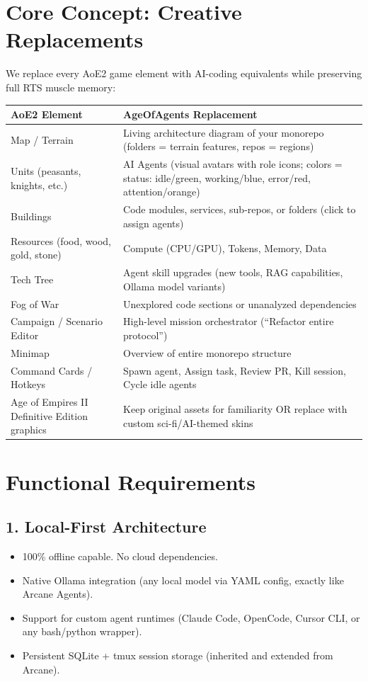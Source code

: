 \documentclass[11pt,a4paper]{article}
\begin{document}
\section{Core Concept: Creative Replacements}

We replace every AoE2 game element with AI-coding equivalents while preserving full RTS muscle memory:

\begin{longtable}{ll}
\toprule
\textbf{AoE2 Element} & \textbf{AgeOfAgents Replacement} \\
\midrule
Map / Terrain & Living architecture diagram of your monorepo (folders = terrain features, repos = regions) \\
Units (peasants, knights, etc.) & AI Agents (visual avatars with role icons; colors = status: idle/green, working/blue, error/red, attention/orange) \\
Buildings & Code modules, services, sub-repos, or folders (click to assign agents) \\
Resources (food, wood, gold, stone) & Compute (CPU/GPU), Tokens, Memory, Data \\
Tech Tree & Agent skill upgrades (new tools, RAG capabilities, Ollama model variants) \\
Fog of War & Unexplored code sections or unanalyzed dependencies \\
Campaign / Scenario Editor & High-level mission orchestrator (``Refactor entire protocol'') \\
Minimap & Overview of entire monorepo structure \\
Command Cards / Hotkeys & Spawn agent, Assign task, Review PR, Kill session, Cycle idle agents \\
Age of Empires II Definitive Edition graphics & Keep original assets for familiarity OR replace with custom sci-fi/AI-themed skins \\
\bottomrule
\end{longtable}

\section{Functional Requirements}

\subsection{1. Local-First Architecture}
\begin{itemize}
    \item 100\% offline capable. No cloud dependencies.
    \item Native Ollama integration (any local model via YAML config, exactly like Arcane Agents).
    \item Support for custom agent runtimes (Claude Code, OpenCode, Cursor CLI, or any bash/python wrapper).
    \item Persistent SQLite + tmux session storage (inherited and extended from Arcane).
\end{itemize}
\end{document}
